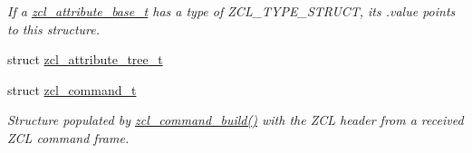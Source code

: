 \begin{DoxyCompactItemize}
\begin{DoxyCompactList}\small\item\em If a \hyperlink{structzcl__attribute__base__t}{zcl\-\_\-attribute\-\_\-base\-\_\-t} has a type of Z\-C\-L\-\_\-\-T\-Y\-P\-E\-\_\-\-S\-T\-R\-U\-C\-T, its .value points to this structure. \end{DoxyCompactList}\item 
struct \hyperlink{structzcl__attribute__tree__t}{zcl\-\_\-attribute\-\_\-tree\-\_\-t}
\item 
struct \hyperlink{structzcl__command__t}{zcl\-\_\-command\-\_\-t}
\begin{DoxyCompactList}\small\item\em Structure populated by \hyperlink{group__zcl_gadeb35ab493fffec9ba1c33f658929136}{zcl\-\_\-command\-\_\-build()} with the Z\-C\-L header from a received Z\-C\-L command frame. \end{DoxyCompactList}\end{DoxyCompactItemize}
